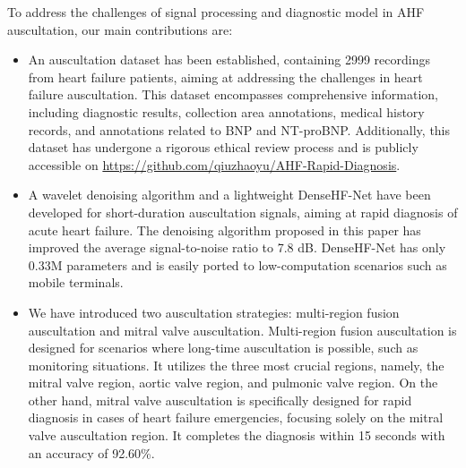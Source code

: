 To address the challenges of signal processing and diagnostic model in AHF auscultation, our main contributions are:

\begin{itemize}
\item  An auscultation dataset has been established, containing 2999  recordings from heart failure patients, aiming at addressing the challenges in heart failure auscultation. This dataset encompasses comprehensive information, including diagnostic results, collection area annotations, medical history records, and annotations related to BNP and NT-proBNP. Additionally, this dataset has undergone a rigorous ethical review process and is publicly accessible on  \href{https://github.com/qiuzhaoyu/AHF-Rapid-Diagnosis}{https://github.com/qiuzhaoyu/AHF-Rapid-Diagnosis}.
\item A wavelet denoising algorithm and a lightweight DenseHF-Net have been developed for short-duration auscultation signals, aiming at rapid diagnosis of acute heart failure. The denoising algorithm proposed in this paper has improved the average signal-to-noise ratio to 7.8 dB. DenseHF-Net has only 0.33M parameters and is easily ported to low-computation scenarios such as mobile terminals. 
\item We have introduced two auscultation strategies: multi-region fusion auscultation and mitral valve auscultation. Multi-region fusion auscultation is designed for scenarios where long-time auscultation is possible, such as monitoring situations. It utilizes the three most crucial regions, namely, the mitral valve region, aortic valve region, and pulmonic valve region. On the other hand, mitral valve auscultation is specifically designed for rapid diagnosis in cases of heart failure emergencies, focusing solely on the mitral valve auscultation region. It completes the diagnosis within 15 seconds with an accuracy of 92.60\%.
\end{itemize}

